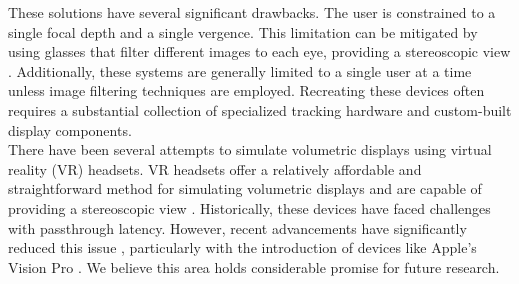 These solutions have several significant drawbacks. The user is constrained to a single focal depth and a single vergence. This limitation can be mitigated by using glasses that filter different images to each eye, providing a stereoscopic view \cite{5701756}. Additionally, these systems are generally limited to a single user at a time unless image filtering techniques are employed. Recreating these devices often requires a substantial collection of specialized tracking hardware and custom-built display components. \\

There have been several attempts to simulate volumetric displays using virtual reality (VR) headsets. VR headsets offer a relatively affordable and straightforward method for simulating volumetric displays and are capable of providing a stereoscopic view \cite{10.1145/3290605.3300763}. Historically, these devices have faced challenges with passthrough latency. However, recent advancements have significantly reduced this issue \cite{10.1145/3290605.3300763}, particularly with the introduction of devices like Apple's Vision Pro \cite{noauthor_apple_vision_nodate}. We believe this area holds considerable promise for future research. \\


